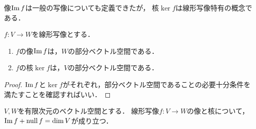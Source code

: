 \documentclass[../sotsu.tex]{subfiles}
\begin{document}
像$\operatorname{Im} f$は一般の写像についても定義できたが，
核$\ker f$は線形写像特有の概念である．



\begin{proposition}
    $f \colon V \to W$を線形写像とする．
    \begin{enumerate}
        \item $f$の像$\operatorname{Im} f$は，$W$の部分ベクトル空間である．
        \item $f$の核$\ker f$は，$V$の部分ベクトル空間である．
    \end{enumerate}
\end{proposition}

\begin{proof}
    $\operatorname{Im} f$と$\ker f$がそれぞれ，部分ベクトル空間であることの必要十分条件を満たすことを確認すればいい．
\end{proof}


\begin{theorem}
    \label{thm:rank-nullity}
    $V, W$を有限次元のベクトル空間とする．
    線形写像$f \colon V \to W$の像と核について，
    $\operatorname{Im} f + \operatorname{null} f = \dim V$が成り立つ\cite[\S 5.1]{miyake-lin-2008}．
\end{theorem}
\end{document}

